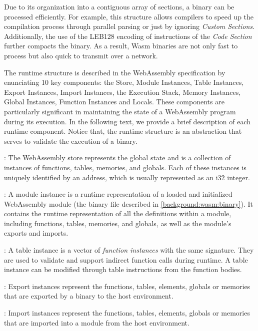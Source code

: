 \vspace{2mm}
Due to its organization into a contiguous array of sections, a \wasm binary can be processed efficiently. 
For example, this structure allows compilers to speed up the compilation process through parallel parsing or just by ignoring \emph{Custom Sections}.
Additionally, the use of the LEB128 encoding of instructions of the \emph{Code Section} further compacts the binary. 
As a result, Wasm binaries are not only fast to process but also quick to transmit over a network.

\label{background:wasm:execution}


The \Wasm runtime structure is described in the WebAssembly specification by enunciating 10 key components: the Store, Module Instances,  Table Instances, Export Instances, Import Instances, the Execution Stack, Memory Instances, Global Instances, Function Instances and Locals.  
These components are particularly significant in maintaining the state of a WebAssembly program during its execution. 
In the following text, we provide a brief description of each runtime component.
Notice that, the runtime structure is an abstraction that serves to validate the execution of a \wasm binary.

: The WebAssembly store represents the global state and is a collection of instances of functions, tables, memories, and globals. Each of these instances is uniquely identified by an address, which is usually represented as an i32 integer.


: A module instance is a runtime representation of a loaded and initialized WebAssembly module (the binary file described in \autoref{background:wasm:binary}). 
It contains the runtime representation of all the definitions within a module, including functions, tables, memories, and globals, as well as the module's exports and imports.


: A table instance is a vector of \emph{function instances} with the same signature. 
They are used to validate and support indirect function calls during runtime.
A table instance can be modified through table instructions from the function bodies.


: Export instances represent the functions, tables, elements, globals or memories that are exported by a \wasm binary to the host environment. 

: Import instances represent the functions, tables, elements, globals or memories that are imported into a module from the host environment. 

